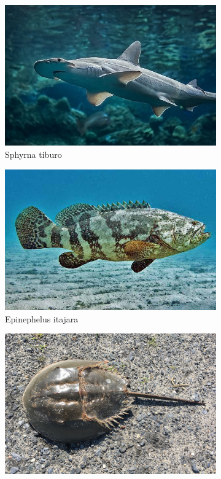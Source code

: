 \documentclass[10pt]{article}
\begin{document}
\begin{figure}[h]
     \centering
     \begin{subfigure}[b]{0.48\textwidth}
         \centering
         \includegraphics[width=\textwidth]{images/sphyrna_tiburo.jpg}
         \caption{Sphyrna tiburo}
     \end{subfigure}
     \hfill
     \begin{subfigure}[b]{0.48\textwidth}
         \centering
         \includegraphics[width=\textwidth]{images/epinephelus_itajara.jpg}
         \caption{Epinephelus itajara}
     \end{subfigure}
     \hfill
     \begin{subfigure}[b]{0.48\textwidth}
         \centering
         \includegraphics[width=\textwidth]{images/limulus_polyphemus.jpg}

\end{subfigure}
\end{figure}
\end{document}
